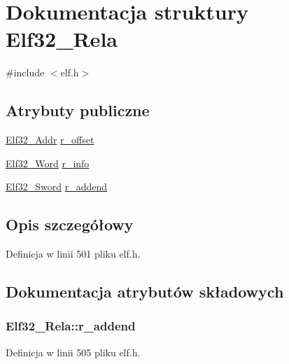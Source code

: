 \hypertarget{struct_elf32___rela}{\section{Dokumentacja struktury Elf32\-\_\-\-Rela}
\label{struct_elf32___rela}
}


{\ttfamily \#include $<$elf.\-h$>$}

\subsection*{Atrybuty publiczne}
\begin{DoxyCompactItemize}
\item 
\hyperlink{elf_8h_a40c6d4571e6001f443cc6a6474620158}{Elf32\-\_\-\-Addr} \hyperlink{struct_elf32___rela_aa850a306ee7fa3935a9f8c3d1aae4e51}{r\-\_\-offset}
\item 
\hyperlink{elf_8h_af5924ece606c732e86f8263a19408e45}{Elf32\-\_\-\-Word} \hyperlink{struct_elf32___rela_ac3a79d3f04209c33ddb4c36d07e68a79}{r\-\_\-info}
\item 
\hyperlink{elf_8h_a30ce6352cf03c667272698ada477da95}{Elf32\-\_\-\-Sword} \hyperlink{struct_elf32___rela_a1952286a900648afb9029c68a8bcea4d}{r\-\_\-addend}
\end{DoxyCompactItemize}


\subsection{Opis szczegółowy}


Definicja w linii 501 pliku elf.\-h.



\subsection{Dokumentacja atrybutów składowych}
\hypertarget{struct_elf32___rela_a1952286a900648afb9029c68a8bcea4d}{
\subsubsection[{r\-\_\-addend}]{ Elf32\-\_\-\-Rela\-::r\-\_\-addend}}\label{struct_elf32___rela_a1952286a900648afb9029c68a8bcea4d}


Definicja w linii 505 pliku elf.\-h.

